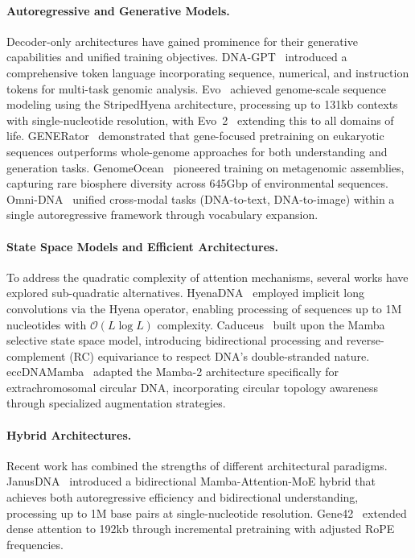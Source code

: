 \documentclass{article}
\theoremstyle{plain}
\theoremstyle{definition}
\theoremstyle{remark}
\begin{document}
\paragraph{Autoregressive and Generative Models.}
Decoder-only architectures have gained prominence for their generative capabilities and unified training objectives. DNA-GPT~\citep{zhang2023dnagptgeneralizedpretrainedtool} introduced a comprehensive token language incorporating sequence, numerical, and instruction tokens for multi-task genomic analysis. Evo~\citep{nguyen2024sequence} achieved genome-scale sequence modeling using the StripedHyena architecture, processing up to 131kb contexts with single-nucleotide resolution, with Evo~2~\citep{Brixi2025.02.18.638918} extending this to all domains of life. GENERator~\citep{wu2025generatorlongcontextgenerativegenomic} demonstrated that gene-focused pretraining on eukaryotic sequences outperforms whole-genome approaches for both understanding and generation tasks. GenomeOcean~\citep{Zhou2025.01.30.635558} pioneered training on metagenomic assemblies, capturing rare biosphere diversity across 645Gbp of environmental sequences. Omni-DNA~\citep{li2025omnidnaunifiedgenomicfoundation} unified cross-modal tasks (DNA-to-text, DNA-to-image) within a single autoregressive framework through vocabulary expansion.

\paragraph{State Space Models and Efficient Architectures.}
To address the quadratic complexity of attention mechanisms, several works have explored sub-quadratic alternatives. HyenaDNA~\citep{nguyen2023hyenadnalongrangegenomicsequence} employed implicit long convolutions via the Hyena operator, enabling processing of sequences up to 1M nucleotides with $\mathcal{O}(L\log L)$ complexity. Caduceus~\citep{schiff2024caduceusbidirectionalequivariantlongrange} built upon the Mamba selective state space model, introducing bidirectional processing and reverse-complement (RC) equivariance to respect DNA's double-stranded nature. eccDNAMamba~\citep{liu2025eccdnamambapretrainedmodelultralong} adapted the Mamba-2 architecture specifically for extrachromosomal circular DNA, incorporating circular topology awareness through specialized augmentation strategies.

\paragraph{Hybrid Architectures.}
Recent work has combined the strengths of different architectural paradigms. JanusDNA~\citep{duan2025janusdnapowerfulbidirectionalhybrid} introduced a bidirectional Mamba-Attention-MoE hybrid that achieves both autoregressive efficiency and bidirectional understanding, processing up to 1M base pairs at single-nucleotide resolution. Gene42~\citep{vishniakov2025gene42longrangegenomicfoundation} extended dense attention to 192kb through incremental pretraining with adjusted RoPE frequencies.
\end{document}

